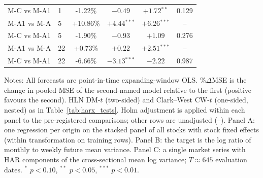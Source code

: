 \begin{table}[htbp]
\begin{tabular}{llcccc}
M-C vs M-A1 & 1 & -1.22\% & $-0.49$ & $+1.72$$^{**}$ & 0.129 \\
M-A1 vs M-A & 5 & +10.86\% & $+4.44$$^{***}$ & $+6.26$$^{***}$ & -- \\
M-C vs M-A1 & 5 & -1.90\% & $-0.93$ & $+1.09$ & 0.276 \\
M-A1 vs M-A & 22 & +0.73\% & $+0.22$ & $+2.51$$^{***}$ & -- \\
M-C vs M-A1 & 22 & -6.66\% & $-3.13$$^{***}$ & $-2.22$ & 0.987 \\
\bottomrule
\end{tabular}
\begin{tablenotes}\small
\item Notes: All forecasts are point-in-time expanding-window OLS. \%$\Delta$MSE is the change in pooled MSE of the second-named model relative to the first (positive favours the second). HLN DM-$t$ (two-sided) and Clark--West CW-$t$ (one-sided, nested) as in Table~\ref{tab:harx_tests}. Holm adjustment is applied within each panel to the pre-registered comparisons; other rows are unadjusted (--). Panel A: one regression per origin on the stacked panel of all stocks with stock fixed effects (within transformation on training rows). Panel B: the target is the log ratio of monthly to weekly future mean variance. Panel C: a single market series with HAR components of the cross-sectional mean log variance; $T\approx645$ evaluation dates. $^{*}$ $p<0.10$, $^{**}$ $p<0.05$, $^{***}$ $p<0.01$.
\end{tablenotes}
\end{table}
